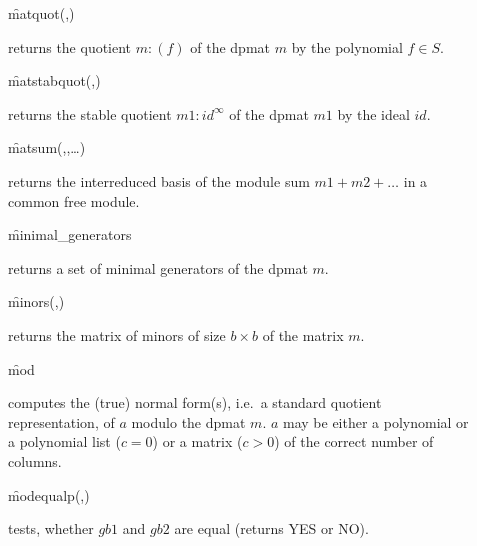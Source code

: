 \begin{description}
\item[]
  \begin{syntax}
    \f{matquot}(,)
  \end{syntax}
  \hypertarget{operator:MATQUOT}{}
returns the quotient $m:(f)$ of the dpmat $m$ by the polynomial
$f\in S$.

\item[]
  \begin{syntax}
    \f{matstabquot}(,)
  \end{syntax}
  \hypertarget{operator:MATSTABQUOT}{}
returns the stable quotient $m1:id^\infty$ of the dpmat $m1$ by
the ideal $id$.

\item[]
  \begin{syntax}
    \f{matsum}(,,\ldots)
  \end{syntax}
  \hypertarget{operator:MATSUM}{}
returns the interreduced basis of the module sum $m1+m2+\ldots$
in a common free module.

\item[]
  \begin{syntax}
    \f{minimal\_generators} 
  \end{syntax}
  \hypertarget{operator:MINIMAL_GENERATORS}{}
returns a set of minimal generators of the dpmat $m$.

\item[]
  \begin{syntax}
    \f{minors}(,)
  \end{syntax}
  \hypertarget{operator:MINORS}{}
returns the matrix of minors of size $b\times b$ of the matrix $m$.

\item[]
  \begin{syntax}
     \f{mod} 
  \end{syntax}
  \hypertarget{operator:CALI_MOD}{}
computes the (true) normal form(s), i.e.\ a standard quotient
representation, of $a$ modulo the dpmat $m$. $a$ may be either a
polynomial or a polynomial list ($c=0$) or a matrix ($c>0$) of the
correct number of columns.

\item[]
  \begin{syntax}
    \f{modequalp}(,)
  \end{syntax}
  \hypertarget{operator:MODEQUALP}{}
tests, whether $gb1$ and $gb2$ are equal (returns YES or NO).


\end{description}
